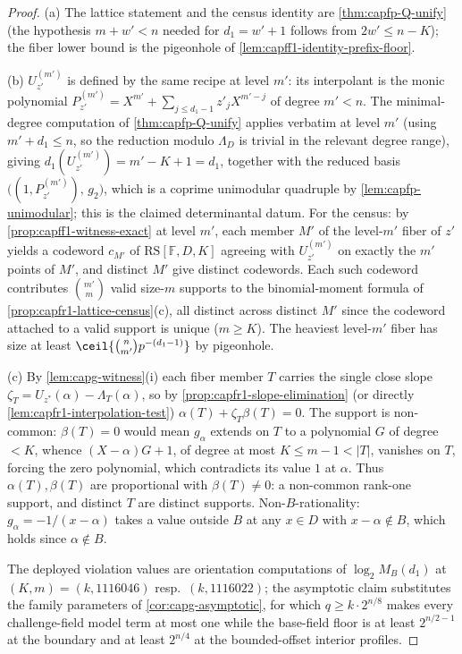 \documentclass[11pt]{article}
\theoremstyle{definition}
\theoremstyle{remark}
\newcommand{\F}{\mathbb{F}}
\newcommand{\B}{B}
\newcommand{\RS}{\mathrm{RS}}
\begin{document}
\begin{proof}
\textup{(a)}  The lattice statement and the census identity are
\cref{thm:capfp-Q-unify} (the hypothesis $m+w'<n$ needed for
$d_1=w'+1$ follows from $2w'\le n-K$); the fiber lower bound is the
pigeonhole of \cref{lem:capff1-identity-prefix-floor}.

\textup{(b)}  $U^{(m')}_{z'}$ is defined by the same recipe at level
$m'$: its interpolant is the monic polynomial
$P^{(m')}_{z'}=X^{m'}+\sum_{j\le d_1-1}z'_jX^{m'-j}$ of degree $m'<n$.
The minimal-degree computation of \cref{thm:capfp-Q-unify} applies
verbatim at level $m'$ (using $m'+d_1\le n$, so the reduction modulo
$\Lambda_D$ is trivial in the relevant degree range), giving
$d_1(U^{(m')}_{z'})=m'-K+1=d_1$, together with the reduced basis
$\bigl((1,P^{(m')}_{z'}),\,g_2\bigr)$, which is a coprime unimodular
quadruple by \cref{lem:capfp-unimodular}; this is the claimed
determinantal datum.  For the census: by
\cref{prop:capff1-witness-exact} at level $m'$, each member $M'$ of the
level-$m'$ fiber of $z'$ yields a codeword $c_{M'}$ of $\RS[\F,D,K]$
agreeing with $U^{(m')}_{z'}$ on exactly the $m'$ points of $M'$, and
distinct $M'$ give distinct codewords.  Each such codeword contributes
$\binom{m'}m$ valid size-$m$ supports to the binomial-moment formula of
\cref{prop:capfr1-lattice-census}\textup{(c)}, all distinct across
distinct $M'$ since the codeword attached to a valid support is unique
($m\ge K$).  The heaviest level-$m'$ fiber has size at least
$\ceil{\binom n{m'}p^{-(d_1-1)}}$ by pigeonhole.

\textup{(c)}  By \cref{lem:capg-witness}\textup{(i)} each fiber member
$T$ carries the single close slope
$\zeta_T=U_{z^{*}}(\alpha)-\Lambda_T(\alpha)$, so by
\cref{prop:capfr1-slope-elimination} (or directly
\cref{lem:capfr1-interpolation-test}) $\alpha(T)+\zeta_T\beta(T)=0$.  The
support is non-common: $\beta(T)=0$ would mean $g_\alpha$ extends on $T$
to a polynomial $G$ of degree $<K$, whence $(X-\alpha)G+1$, of degree at
most $K\le m-1<|T|$, vanishes on $T$, forcing the zero polynomial, which
contradicts its value $1$ at $\alpha$.  Thus $\alpha(T),\beta(T)$ are
proportional with $\beta(T)\ne0$: a non-common rank-one support, and
distinct $T$ are distinct supports.  Non-$\B$-rationality:
$g_\alpha=-1/(x-\alpha)$ takes a value outside $\B$ at any $x\in D$ with
$x-\alpha\notin\B$, which holds since $\alpha\notin\B$.

The deployed violation values are orientation computations of
$\log_2M_{\B}(d_1)$ at $(K,m)=(k,1116046)$ resp.\ $(k,1116022)$; the
asymptotic claim substitutes the family parameters of
\cref{cor:capg-asymptotic}, for which
$q\ge k\cdot2^{n/8}$ makes every challenge-field model term at most one
while the base-field floor is at least $2^{n/2-1}$ at the boundary and at
least $2^{n/4}$ at the bounded-offset interior profiles.
\end{proof}
\end{document}

